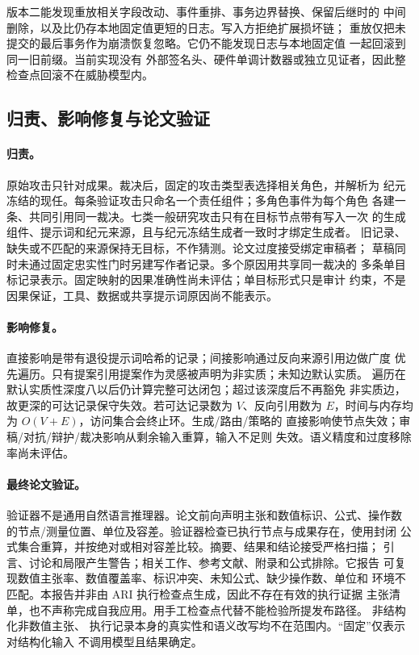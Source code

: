 版本二能发现重放相关字段改动、事件重排、事务边界替换、保留后继时的
中间删除，以及比仍存本地固定值更短的日志。写入方拒绝扩展损坏链；
重放仅把未提交的最后事务作为崩溃恢复忽略。它仍不能发现日志与本地固定值
一起回滚到同一旧前缀。当前实现没有
外部签名头、硬件单调计数器或独立见证者，因此整检查点回滚不在威胁模型内。

\subsection{归责、影响修复与论文验证}\label{sec:appendix:algorithms}

\paragraph{归责。}
原始攻击只针对成果。裁决后，固定的攻击类型表选择相关角色，并解析为
纪元冻结的现任。每条验证攻击只命名一个责任组件；多角色事件为每个角色
各建一条、共同引用同一裁决。七类一般研究攻击只有在目标节点带有写入一次
的生成组件、提示词和纪元来源，且与纪元冻结生成者一致时才绑定生成者。
旧记录、缺失或不匹配的来源保持无目标，不作猜测。论文过度接受绑定审稿者；
草稿同时未通过固定忠实性门时另建写作者记录。多个原因用共享同一裁决的
多条单目标记录表示。固定映射的因果准确性尚未评估；单目标形式只是审计
约束，不是因果保证，工具、数据或共享提示词原因尚不能表示。

\paragraph{影响修复。}
直接影响是带有退役提示词哈希的记录；间接影响通过反向来源引用边做广度
优先遍历。只有提案引用提案作为灵感被声明为非实质；未知边默认实质。
遍历在默认实质性深度八以后仍计算完整可达闭包；超过该深度后不再豁免
非实质边，故更深的可达记录保守失效。若可达记录数为 $V$、反向引用数为
$E$，时间与内存均为 $O(V+E)$，访问集合会终止环。生成/路由/策略的
直接影响使节点失效；审稿/对抗/辩护/裁决影响从剩余输入重算，输入不足则
失效。语义精度和过度移除率尚未评估。

\paragraph{最终论文验证。}
验证器不是通用自然语言推理器。论文前向声明主张和数值标识、公式、操作数
的节点/测量位置、单位及容差。验证器检查已执行节点与成果存在，使用封闭
公式集合重算，并按绝对或相对容差比较。摘要、结果和结论接受严格扫描；
引言、讨论和局限产生警告；相关工作、参考文献、附录和公式排除。它报告
可复现数值主张率、数值覆盖率、标识冲突、未知公式、缺少操作数、单位和
环境不匹配。本报告并非由 ARI 执行检查点生成，因此不存在有效的执行证据
主张清单，也不声称完成自我应用。用手工检查点代替不能检验所提发布路径。
非结构化非数值主张、
执行记录本身的真实性和语义改写均不在范围内。“固定”仅表示对结构化输入
不调用模型且结果确定。

